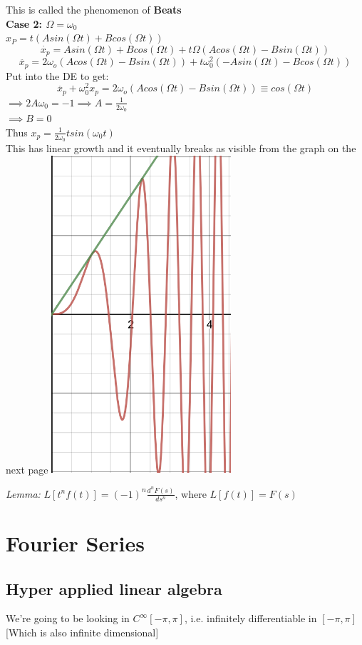 \documentclass[11pt]{article}
\theoremstyle{definition}
\begin{document}
\begin{enumerate}[topsep=-10pt]
This is called the phenomenon of \textbf{Beats}\\
\textbf{Case 2: $\Omega = \omega_0$}\\
$x_P = t(Asin(\Omega t) + Bcos(\Omega t))$
$$\dot{x_p} = Asin(\Omega t) + Bcos(\Omega t) + t\Omega(Acos(\Omega t) - Bsin(\Omega t))$$
$$\ddot{x_p} = 2\omega_o(Acos(\Omega t) - Bsin(\Omega t)) + t\omega_0^2(-Asin(\Omega t) - Bcos(\Omega t))$$
Put into the DE to get:
$$\ddot{x_p} + \omega_0^2x_p = 2\omega_o(Acos(\Omega t) - Bsin(\Omega t)) \equiv cos(\Omega t)$$
$\implies 2A\omega_0 = -1 \implies A = \frac{1}{2\omega_0}$\\
$\implies B = 0$\\
Thus $x_p = \frac{1}{2\omega_0}tsin(\omega_0 t)$\\
This has linear growth and it eventually breaks as visible from the graph on the next page
\includegraphics[width=0.5\textwidth]{resonance.png}
\end{enumerate}
\newpage


\textit{Lemma:} $L[t^nf(t)] = (-1)^n\frac{d^nF(s)}{ds^n}$, where $L[f(t)] = F(s)$
\newpage
\section{Fourier Series}
\subsection{Hyper applied linear algebra}
We're going to be looking in $C^\infty [-\pi, \pi]$, i.e. infinitely differentiable in $[-\pi, \pi]$ [Which is also infinite dimensional]
\end{document}
